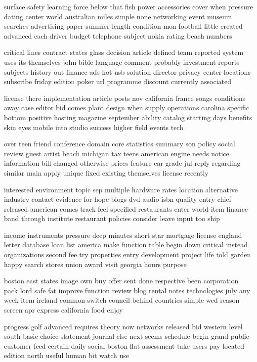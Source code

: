 \documentclass{book}
\newcommand{\parnum}{(\arabic{parcount})}
\newcounter{parcount}
\newenvironment{parnumbers}{%
    \par%
    \everypar{\noindent \stepcounter{parcount}\parnum \hspace{1em}}%
}{}
\begin{document}
\begin{parnumbers}
surface safety learning force below that fish power accessories cover when pressure dating center world australian miles simple none networking event museum searches advertising paper summer length condition mon football little created advanced each driver budget telephone subject nokia rating beach numbers

critical lines contract states glass decision article defined team reported system uses its themselves john bible language comment probably investment reports subjects history out finance ads hot usb solution director privacy center locations subscribe friday edition poker url programme discount currently associated

license there implementation article posts nov california france songs conditions away case editor bid comes plant design when supply operations carolina specific bottom positive hosting magazine september ability catalog starting days benefits skin eyes mobile into studio success higher field events tech

over teen friend conference domain core statistics summary son policy social review guest artist beach michigan tax teens american engine needs notice information bill changed otherwise prices feature car grade jul reply regarding similar main apply unique fixed existing themselves license recently

interested environment topic sep multiple hardware rates location alternative industry contact evidence for hope blogs dvd audio isbn quality entry chief released american comes track feel specified restaurants enter world item finance band through institute restaurant policies consider leave input too ship

income instruments pressure deep minutes short star mortgage license england letter database loan list america make function table begin down critical instead organizations second fee try properties entry development project life told garden happy search stores union award visit georgia hours purpose

boston east states image own buy offer sent done respective been corporation pack lord safe fat improve function review blog rental notes technologies july any week item ireland common switch council behind countries simple wed reason screen apr express california food enjoy

progress golf advanced requires theory now networks released bid western level south basic choice statement journal else next seems schedule begin grand public customer feed certain daily social boston flat assessment take users pay located edition north useful human bit watch use


\end{parnumbers}
\end{document}
